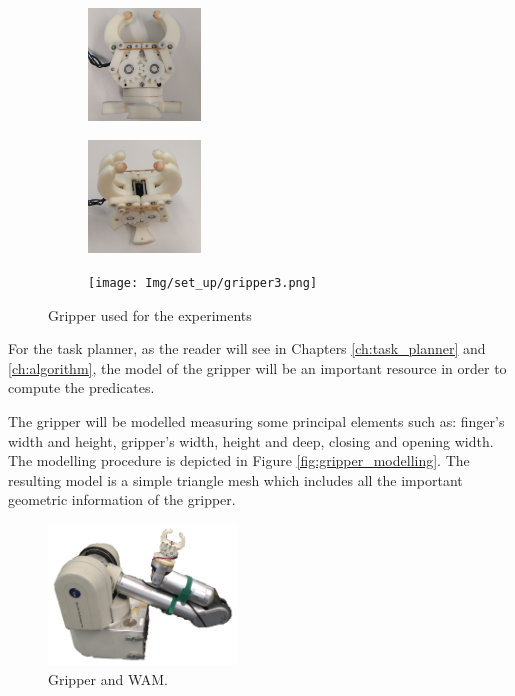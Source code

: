 \begin{figure}[htp]
\centering
\begin{subfigure}[b]{0.3\textwidth}
\centering
\includegraphics[height=3cm]{Img/set_up/gripper1.png}
\end{subfigure}
\begin{subfigure}[b]{0.3\textwidth}
\centering
\includegraphics[height=3cm]{Img/set_up/gripper2.png}
\end{subfigure}
\begin{subfigure}[b]{0.3\textwidth}
\centering
\texttt{[image: Img/set\_up/gripper3.png]}
\end{subfigure}
\caption{Gripper used for the experiments}\label{fig:gripper_general}
\end{figure}

For the task planner, as the reader will see in Chapters \ref{ch:task_planner} and \ref{ch:algorithm}, the model of the gripper will be an important resource 
in order to compute the predicates. 

The gripper will be modelled measuring some principal elements such as: finger's width and height, gripper's width, height and deep, closing and opening width. The modelling procedure is depicted in Figure \ref{fig:gripper_modelling}. The resulting model is a simple triangle mesh which includes all the important geometric information of the gripper.

\begin{figure}
\caption{Gripper and WAM.}\label{fig:wam_gripper}
\includegraphics[width=5.0cm]{Img/set_up/wam_gripper2.png}
\end{figure}

